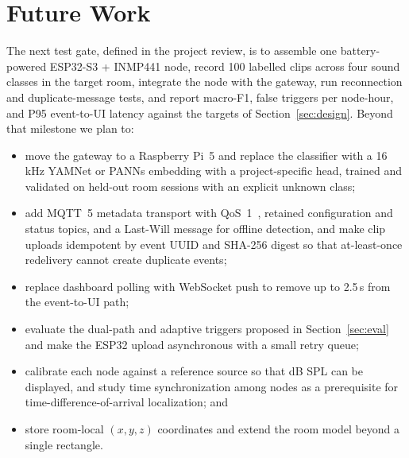 \documentclass[conference]{IEEEtran}
\begin{document}
\section{Future Work}
\label{sec:future}
The next test gate, defined in the project review, is to assemble one battery-powered ESP32-S3 + INMP441 node, record 100 labelled clips across four sound classes in the target room, integrate the node with the gateway, run reconnection and duplicate-message tests, and report macro-F1, false triggers per node-hour, and P95 event-to-UI latency against the targets of Section~\ref{sec:design}. Beyond that milestone we plan to:
\begin{itemize}
\item move the gateway to a Raspberry Pi~5 and replace the classifier with a 16\,kHz YAMNet or PANNs embedding with a project-specific head, trained and validated on held-out room sessions with an explicit unknown class;
\item add MQTT~5 metadata transport with QoS~1~\cite{mqtt5}, retained configuration and status topics, and a Last-Will message for offline detection, and make clip uploads idempotent by event UUID and SHA-256 digest so that at-least-once redelivery cannot create duplicate events;
\item replace dashboard polling with WebSocket push to remove up to 2.5\,s from the event-to-UI path;
\item evaluate the dual-path and adaptive triggers proposed in Section~\ref{sec:eval} and make the ESP32 upload asynchronous with a small retry queue;
\item calibrate each node against a reference source so that dB SPL can be displayed, and study time synchronization among nodes as a prerequisite for time-difference-of-arrival localization; and
\item store room-local $(x, y, z)$ coordinates and extend the room model beyond a single rectangle.
\end{itemize}

\end{document}
